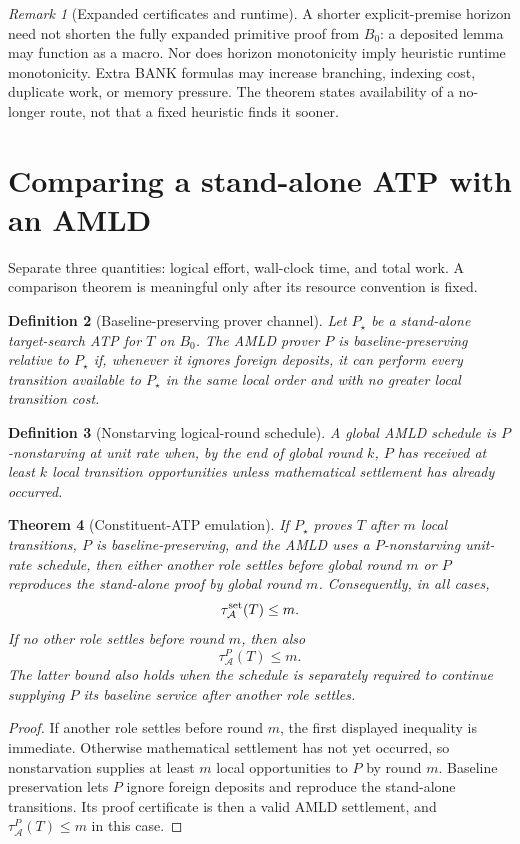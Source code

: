 \documentclass[11pt]{article}
\newtheorem{definition}{Definition}[section]
\newtheorem{theorem}[definition]{Theorem}
\theoremstyle{remark}
\newtheorem{remark}[definition]{Remark}
\begin{document}
\begin{remark}[Expanded certificates and runtime]
A shorter explicit-premise horizon need not shorten the fully expanded primitive proof from $B_0$: a deposited lemma may function as a macro. Nor does horizon monotonicity imply heuristic runtime monotonicity. Extra BANK formulas may increase branching, indexing cost, duplicate work, or memory pressure. The theorem states availability of a no-longer route, not that a fixed heuristic finds it sooner.
\end{remark}

\section{Comparing a stand-alone ATP with an AMLD}
Separate three quantities: logical effort, wall-clock time, and total work. A comparison theorem is meaningful only after its resource convention is fixed.

\begin{definition}[Baseline-preserving prover channel]
Let $P_\star$ be a stand-alone target-search ATP for $T$ on $B_0$. The AMLD prover $P$ is baseline-preserving relative to $P_\star$ if, whenever it ignores foreign deposits, it can perform every transition available to $P_\star$ in the same local order and with no greater local transition cost.
\end{definition}

\begin{definition}[Nonstarving logical-round schedule]
A global AMLD schedule is $P$-nonstarving at unit rate when, by the end of global round $k$, $P$ has received at least $k$ local transition opportunities unless mathematical settlement has already occurred.
\end{definition}

\begin{theorem}[Constituent-ATP emulation]
If $P_\star$ proves $T$ after $m$ local transitions, $P$ is baseline-preserving, and the AMLD uses a $P$-nonstarving unit-rate schedule, then either another role settles before global round $m$ or $P$ reproduces the stand-alone proof by global round $m$. Consequently, in all cases,
\[
\tau^{\rm set}_{\mathcal A}(T)\le m.
\]
If no other role settles before round $m$, then also
\[
\tau^P_{\mathcal A}(T)\le m.
\]
The latter bound also holds when the schedule is separately required to continue supplying $P$ its baseline service after another role settles.
\end{theorem}
\begin{proof}
If another role settles before round $m$, the first displayed inequality is immediate. Otherwise mathematical settlement has not yet occurred, so nonstarvation supplies at least $m$ local opportunities to $P$ by round $m$. Baseline preservation lets $P$ ignore foreign deposits and reproduce the stand-alone transitions. Its proof certificate is then a valid AMLD settlement, and $\tau^P_{\mathcal A}(T)\le m$ in this case.
\end{proof}
\end{document}
